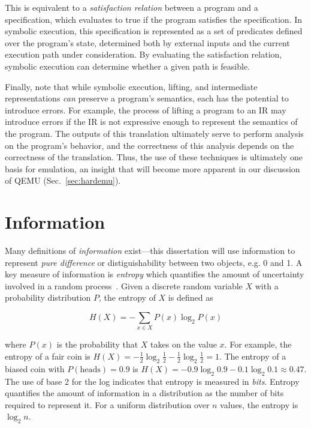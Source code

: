 This is equivalent to a \emph{satisfaction relation} between a program and a specification, which evaluates to true if the program satisfies the specification.
In symbolic execution, this specification is represented as a set of predicates defined over the program's state, determined both by external inputs and the current execution path under consideration.
By evaluating the satisfaction relation, symbolic execution can determine whether a given path is feasible.

Finally, note that while symbolic execution, lifting, and intermediate representations \emph{can} preserve a program's semantics, each has the potential to introduce errors.
For example, the process of lifting a program to an IR may introduce errors if the IR is not expressive enough to represent the semantics of the program.
The outputs of this translation ultimately serve to perform analysis on the program's behavior, and the correctness of this analysis depends on the correctness of the translation.
Thus, the use of these techniques is ultimately one basis for emulation, an insight that will become more apparent in our discussion of QEMU (Sec.~\ref{sec:hardemu}).

\section{Information}

Many definitions of \emph{information} exist---this dissertation will use information to represent \emph{pure difference} or distiguishability between two objects, e.g. 0 and 1.
A key measure of information is \emph{entropy} which quantifies the amount of uncertainty involved in a random process~\cite{cover1999elements}.
Given a discrete random variable $X$ with a probability distribution $P$, the entropy of $X$ is defined as

\begin{equation}
H(X) = -\sum_{x \in X} P(x) \log_2 P(x)
\end{equation}

\noindent
where $P(x)$ is the probability that $X$ takes on the value $x$.
For example, the entropy of a fair coin is $H(X) = -\frac{1}{2} \log_2 \frac{1}{2} - \frac{1}{2} \log_2 \frac{1}{2} = 1$.
The entropy of a biased coin with $P(\text{heads}) = 0.9$ is $H(X) = -0.9 \log_2 0.9 - 0.1 \log_2 0.1 \approx 0.47$.
The use of base 2 for the log indicates that entropy is measured in \emph{bits}.
Entropy quantifies the amount of information in a distribution as the number of bits required to represent it.
For a uniform distribution over $n$ values, the entropy is $\log_2 n$.

